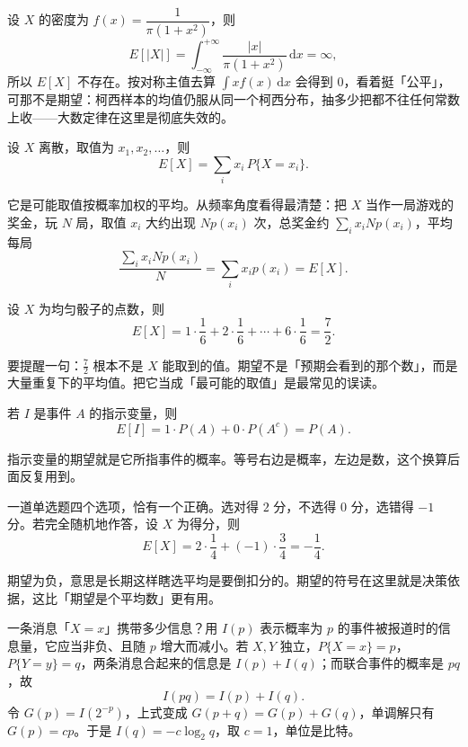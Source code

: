 \begin{example}
设 $X$ 的密度为 $f(x)=\dfrac{1}{\pi(1+x^2)}$，则
\[
E[|X|]=\int_{-\infty}^{+\infty}\frac{|x|}{\pi(1+x^2)}\,\mathrm{d}x=\infty,
\]
所以 $E[X]$ 不存在。按对称主值去算 $\int xf(x)\,\mathrm{d}x$ 会得到 $0$，看着挺「公平」，可那不是期望：柯西样本的均值仍服从同一个柯西分布，抽多少把都不往任何常数上收——大数定律在这里是彻底失效的。
\end{example}

\begin{definition}[离散型的期望]
设 $X$ 离散，取值为 $x_1,x_2,\dots$，则
\[
E[X]=\sum_i x_i\,P\{X=x_i\}.
\]
\end{definition}

它是可能取值按概率加权的平均。从频率角度看得最清楚：把 $X$ 当作一局游戏的奖金，玩 $N$ 局，取值 $x_i$ 大约出现 $Np(x_i)$ 次，总奖金约 $\sum_i x_iNp(x_i)$，平均每局
\[
\frac{\sum_i x_iNp(x_i)}{N}=\sum_i x_ip(x_i)=E[X].
\]

\begin{example}[掷骰子]
设 $X$ 为均匀骰子的点数，则
\[
E[X]=1\cdot\frac16+2\cdot\frac16+\cdots+6\cdot\frac16=\frac72 .
\]
\end{example}

要提醒一句：$\frac72$ 根本不是 $X$ 能取到的值。期望不是「预期会看到的那个数」，而是大量重复下的平均值。把它当成「最可能的取值」是最常见的误读。

\begin{example}[指示变量]
若 $I$ 是事件 $A$ 的指示变量，则
\[
E[I]=1\cdot P(A)+0\cdot P(A^c)=P(A).
\]
\end{example}

指示变量的期望就是它所指事件的概率。等号右边是概率，左边是数，这个换算后面反复用到。

\begin{example}[多选题的期望得分]
一道单选题四个选项，恰有一个正确。选对得 $2$ 分，不选得 $0$ 分，选错得 $-1$ 分。若完全随机地作答，设 $X$ 为得分，则
\[
E[X]=2\cdot\frac14+(-1)\cdot\frac34=-\frac14 .
\]
\end{example}

期望为负，意思是长期这样瞎选平均是要倒扣分的。期望的符号在这里就是决策依据，这比「期望是个平均数」更有用。

\begin{example}[熵]
一条消息「$X=x$」携带多少信息？用 $I(p)$ 表示概率为 $p$ 的事件被报道时的信息量，它应当非负、且随 $p$ 增大而减小。若 $X,Y$ 独立，$P\{X=x\}=p$，$P\{Y=y\}=q$，两条消息合起来的信息是 $I(p)+I(q)$；而联合事件的概率是 $pq$，故
\[
I(pq)=I(p)+I(q).
\]
令 $G(p)=I(2^{-p})$，上式变成 $G(p+q)=G(p)+G(q)$，单调解只有 $G(p)=cp$。于是 $I(q)=-c\log_2 q$，取 $c=1$，单位是比特。
\end{example}

